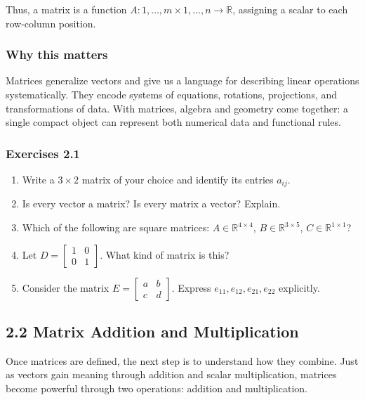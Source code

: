 \documentclass[
  12pt,
  a4paper,
]{article}
\begin{document}
Thus, a matrix is a function
\(A: {1,\dots,m} \times {1,\dots,n} \to \mathbb{R}\), assigning a scalar
to each row-column position.

\subsubsection{Why this matters}\label{why-this-matters-4}

Matrices generalize vectors and give us a language for describing linear
operations systematically. They encode systems of equations, rotations,
projections, and transformations of data. With matrices, algebra and
geometry come together: a single compact object can represent both
numerical data and functional rules.

\subsubsection{Exercises 2.1}\label{exercises-21}

\begin{enumerate}
\def\labelenumi{\arabic{enumi}.}
\item
  Write a \(3 \times 2\) matrix of your choice and identify its entries
  \(a_{ij}\).
\item
  Is every vector a matrix? Is every matrix a vector? Explain.
\item
  Which of the following are square matrices:
  \(A \in \mathbb{R}^{4\times4}\), \(B \in \mathbb{R}^{3\times5}\),
  \(C \in \mathbb{R}^{1\times1}\)?
\item
  Let \(D = \begin{bmatrix} 1 & 0 \\ 0 & 1 \end{bmatrix}\). What kind of
  matrix is this?
\item
  Consider the matrix
  \(E = \begin{bmatrix} a & b \\ c & d \end{bmatrix}\). Express
  \(e_{11}, e_{12}, e_{21}, e_{22}\) explicitly.
\end{enumerate}

\subsection{2.2 Matrix Addition and
Multiplication}\label{22-matrix-addition-and-multiplication}

Once matrices are defined, the next step is to understand how they
combine. Just as vectors gain meaning through addition and scalar
multiplication, matrices become powerful through two operations:
addition and multiplication.
\end{document}
